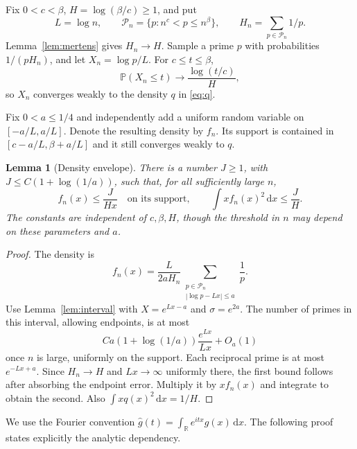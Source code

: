 \documentclass[11pt]{article}
\newtheorem{lemma}[theorem]{Lemma}
\theoremstyle{remark}\newtheorem{remark}[theorem]{Remark}
\newcommand{\Prob}{\mathbb P}
\newcommand{\dd}{\,\mathrm d}
\begin{document}
Fix $0<c<\beta$, $H=\log(\beta/c)\ge1$, and put
\[
 L=\log n,\qquad \mathcal P_n=\{p:n^c<p\le n^\beta\},
 \qquad H_n=\sum_{p\in\mathcal P_n}1/p.
\]
Lemma~\ref{lem:mertens} gives $H_n\to H$. Sample a prime $p$ with probabilities $1/(pH_n)$, and let $X_n=\log p/L$. For $c\le t\le\beta$,
\[
 \Prob(X_n\le t)\longrightarrow\frac{\log(t/c)}H,
\]
so $X_n$ converges weakly to the density $q$ in \eqref{eq:q}.

Fix $0<a\le1/4$ and independently add a uniform random variable on $[-a/L,a/L]$. Denote the resulting density by $f_n$. Its support is contained in $[c-a/L,\beta+a/L]$ and it still converges weakly to $q$.

\begin{lemma}[Density envelope]\label{lem:envelope}
There is a number $J\ge1$, with $J\le C(1+\log(1/a))$, such that, for all sufficiently large $n$,
\begin{equation}\label{eq:envelope}
 f_n(x)\le\frac J{Hx}\quad\text{on its support},\qquad
 \int x f_n(x)^2\dd x\le\frac JH.
\end{equation}
The constants are independent of $c,\beta,H$, though the threshold in $n$ may depend on these parameters and $a$.
\end{lemma}
\begin{proof}
The density is
\[
 f_n(x)=\frac L{2aH_n}
 \sum_{\substack{p\in\mathcal P_n\\|\log p-Lx|\le a}}\frac1p.
\]
Use Lemma~\ref{lem:interval} with $X=e^{Lx-a}$ and $\sigma=e^{2a}$. The number of primes in this interval, allowing endpoints, is at most
\[
 C a(1+\log(1/a))\frac{e^{Lx}}{Lx}+O_a(1)
\]
once $n$ is large, uniformly on the support. Each reciprocal prime is at most $e^{-Lx+a}$. Since $H_n\to H$ and $Lx\to\infty$ uniformly there, the first bound follows after absorbing the endpoint error. Multiply it by $x f_n(x)$ and integrate to obtain the second. Also $\int xq(x)^2\dd x=1/H$.
\end{proof}

We use the Fourier convention $\widehat g(t)=\int_{\mathbb R}e^{itx}g(x)\dd x$. The following proof states explicitly the analytic dependency.
\end{document}
